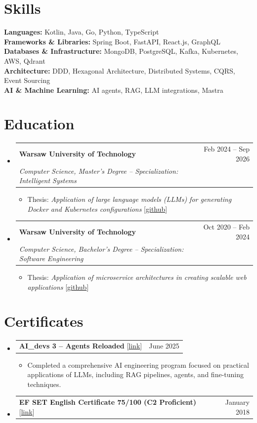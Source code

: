 \documentclass[letterpaper,11pt]{article}
\makeatletter
\newcommand{\resumeItem}[1]{
  \item\small{#1 \vspace{-2pt}}
}
\newcommand{\resumeSubheading}[4]{
  \vspace{-2pt}\item
    \begin{tabular*}{0.97\textwidth}[t]{l@{\extracolsep{\fill}}r}
      \textbf{#1} & #2 \\
      \textit{\small#3} & \textit{\small #4} \\
    \end{tabular*}\vspace{-7pt}
}
\newcommand{\resumeProjectHeading}[2]{
    \item
    \begin{tabular*}{0.97\textwidth}{l@{\extracolsep{\fill}}r}
      \small#1 & #2 \\
    \end{tabular*}\vspace{-7pt}
}
\newcommand{\resumeSubHeadingListStart}{\begin{itemize}[leftmargin=0.15in, label={}]}
\newcommand{\resumeSubHeadingListEnd}{\end{itemize}}
\newcommand{\resumeItemListStart}{\begin{itemize}}
\newcommand{\resumeItemListEnd}{\end{itemize}\vspace{-5pt}}
\makeatother
\begin{document}
\section{Skills}
  \begin{itemize}[leftmargin=0.15in, label={}]
    \small{\item{
      \textbf{Languages:} Kotlin, Java, Go, Python, TypeScript \\
      \textbf{Frameworks \& Libraries:} Spring Boot, FastAPI, React.js, GraphQL \\
      \textbf{Databases \& Infrastructure:} MongoDB, PostgreSQL, Kafka, Kubernetes, AWS, Qdrant \\
      \textbf{Architecture:} DDD, Hexagonal Architecture, Distributed Systems, CQRS, Event Sourcing \\
      \textbf{AI \& Machine Learning:} AI agents, RAG, LLM integrations, Mastra \\
    }}
  \end{itemize}


\section{Education}
  \resumeSubHeadingListStart

    \resumeSubheading
      {Warsaw University of Technology}{Feb 2024 -- Sep 2026}
      {Computer Science, Master's Degree -- Specialization: Intelligent Systems}{}
      \resumeItemListStart
        \resumeItem{Thesis: \textit{Application of large language models (LLMs) for generating Docker and Kubernetes configurations} [\href{https://github.com/BartlomiejRasztabiga/masters-thesis}{github}]}
      \resumeItemListEnd

    \resumeSubheading
      {Warsaw University of Technology}{Oct 2020 -- Feb 2024}
      {Computer Science, Bachelor's Degree -- Specialization: Software Engineering}{}
      \resumeItemListStart
        \resumeItem{Thesis: \textit{Application of microservice architectures in creating scalable web applications} [\href{https://github.com/BartlomiejRasztabiga/bachelors-thesis}{github}]}
      \resumeItemListEnd

  \resumeSubHeadingListEnd


\section{Certificates}
  \resumeSubHeadingListStart
    \resumeProjectHeading
      {\textbf{AI\_devs 3 -- Agents Reloaded} [\href{https://link.rasztabiga.me/aidevs}{link}]}{June 2025}
      \resumeItemListStart
        \resumeItem{Completed a comprehensive AI engineering program focused on practical applications of LLMs, including RAG pipelines, agents, and fine-tuning techniques.}
      \resumeItemListEnd
    \resumeProjectHeading
      {\textbf{EF SET English Certificate 75/100 (C2 Proficient)} [\href{https://cert.efset.org/Y6YgEc}{link}]}{January 2018}
  \resumeSubHeadingListEnd
\end{document}
